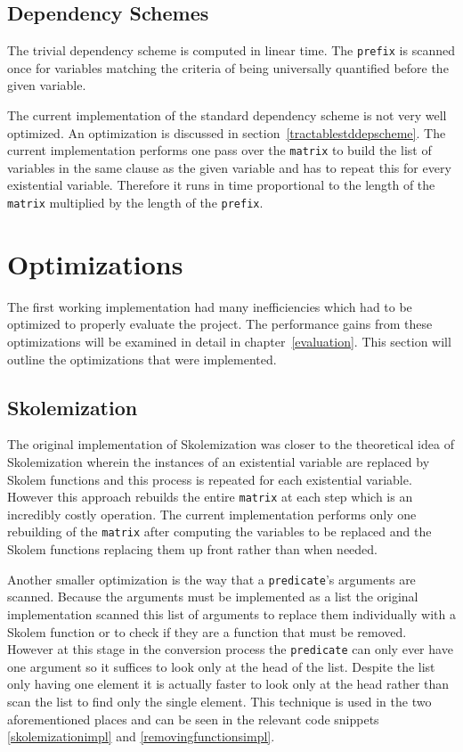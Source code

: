 \subsection{Dependency Schemes} \label{depschemecomplexity}
The trivial dependency scheme is computed in linear time. The \texttt{prefix} is scanned once for variables matching the criteria of being universally quantified before the given variable.

The current implementation of the standard dependency scheme is not very well optimized. An optimization is discussed in section~\ref{tractablestddepscheme}. The current implementation performs one pass over the \texttt{matrix} to build the list of variables in the same clause as the given variable and has to repeat this for every existential variable. Therefore it runs in time proportional to the length of the \texttt{matrix} multiplied by the length of the \texttt{prefix}.

\section{Optimizations} \label{optimizations}
The first working implementation had many inefficiencies which had to be optimized to properly evaluate the project. The performance gains from these optimizations will be examined in detail in chapter~\ref{evaluation}. This section will outline the optimizations that were implemented.

\subsection{Skolemization}
The original implementation of Skolemization was closer to the theoretical idea of Skolemization wherein the instances of an existential variable are replaced by Skolem functions and this process is repeated for each existential variable. However this approach rebuilds the entire \texttt{matrix} at each step which is an incredibly costly operation. The current implementation performs only one rebuilding of the \texttt{matrix} after computing the variables to be replaced and the Skolem functions replacing them up front rather than when needed.

Another smaller optimization is the way that a \texttt{predicate}'s arguments are scanned. Because the arguments must be implemented as a list the original implementation scanned this list of arguments to replace them individually with a Skolem function or to check if they are a function that must be removed. However at this stage in the conversion process the \texttt{predicate} can only ever have one argument so it suffices to look only at the head of the list. Despite the list only having one element it is actually faster to look only at the head rather than scan the list to find only the single element. This technique is used in the two aforementioned places and can be seen in the relevant code snippets \ref{skolemizationimpl} and \ref{removingfunctionsimpl}.

